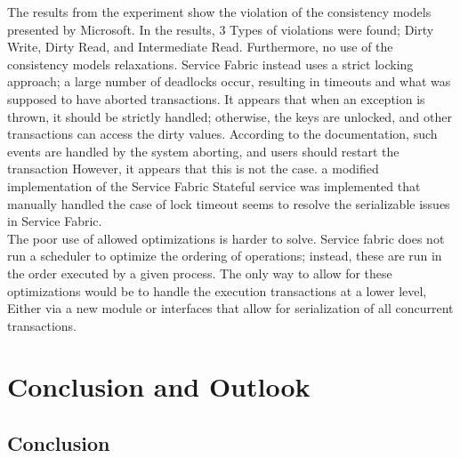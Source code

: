 \documentclass[a4paper,10pt,titlepage]{report}
\begin{document}
The results from the experiment show the violation of the consistency models presented by Microsoft. In the results, 3 Types of violations were found; Dirty Write, Dirty Read, and Intermediate Read. Furthermore, no use of the consistency models relaxations. Service Fabric instead uses a strict locking approach; a large number of deadlocks occur, resulting in timeouts and what was supposed to have aborted transactions. It appears that when an exception is thrown, it should be strictly handled; otherwise, the keys are unlocked, and other transactions can access the dirty values. According to the documentation, such events are handled by the system aborting, and users should restart the transaction\cite{servicefabricguidelines}
However, it appears that this is not the case. a modified implementation of the Service Fabric Stateful service was implemented that manually handled the case of lock timeout seems to resolve the serializable issues in Service Fabric.\\
\vspace{5mm}
The poor use of allowed optimizations is harder to solve. Service fabric does not run a scheduler to optimize the ordering of operations; instead, these are run in the order executed by a given process. The only way to allow for these optimizations would be to handle the execution transactions at a lower level, Either via a new module or interfaces that allow for serialization of all concurrent transactions.

\chapter{Conclusion and Outlook}
\section*{Conclusion}
\end{document}
